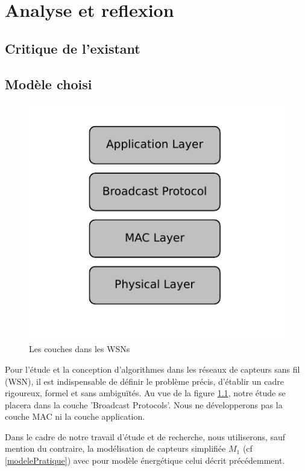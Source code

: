 
\chapter{Analyse et reflexion}\label{Analyse_et_reflexion}


\section{Critique de l'existant}


\section{Modèle choisi}

\begin{figure}[h]
\centering
\includegraphics[scale=0.9]{Etat_de_l'art/source/layer.pdf}
\caption{\label{Layer} Les couches dans les WSNs}
\end{figure}

Pour l'étude et la conception d'algorithmes dans les réseaux de capteurs sans fil (WSN), il est indispensable de définir le problème précis, d'établir un cadre rigoureux, formel et sans ambiguïtés. Au vue de la figure \ref{Layer}, notre étude se placera dans la couche 'Broadcast Protocols'. Nous ne développerons pas la couche MAC ni la couche application.

Dans le cadre de notre travail d'étude et de recherche, nous utiliserons, sauf mention du contraire, la modélisation de capteurs simplifiée $M_1$ (cf \ref{modelePratique}) avec pour modèle énergétique celui décrit précédemment.
 


